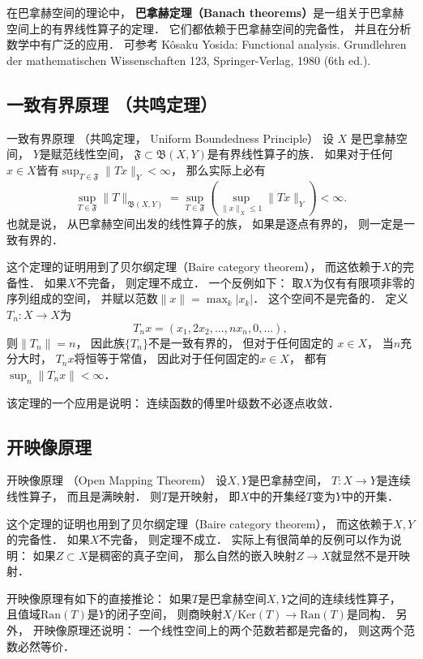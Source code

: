 
在巴拿赫空间的理论中， \textbf{巴拿赫定理（Banach theorems）}是一组关于巴拿赫空间上的有界线性算子的定理． 它们都依赖于巴拿赫空间的完备性， 并且在分析数学中有广泛的应用． 可参考 Kôsaku Yosida: Functional analysis. Grundlehren der mathematischen Wissenschaften 123, Springer-Verlag, 1980 (6th ed.).

\subsection{一致有界原理 （共鸣定理）}
\begin{theorem}{一致有界原理 （共鸣定理， Uniform Boundedness Principle）}
设 $X$ 是巴拿赫空间， $Y$是赋范线性空间， $\mathfrak{F}\subset\mathfrak{B}(X,Y)$是有界线性算子的族． 如果对于任何$x\in X$皆有$\sup_{T\in\mathfrak{F}}\|Tx\|_Y<\infty$， 那么实际上必有
$$
\sup_{T\in\mathfrak{F}}\|T\|_{\mathfrak{B}(X,Y)}
=\sup_{T\in\mathfrak{F}}\left(\sup_{\|x\|_X\leq 1}\|Tx\|_Y\right)<\infty.
$$
也就是说， 从巴拿赫空间出发的线性算子的族， 如果是逐点有界的， 则一定是一致有界的． 
\end{theorem}
这个定理的证明用到了贝尔纲定理（Baire category theorem）， 而这依赖于$X$的完备性． 如果$X$不完备， 则定理不成立． 一个反例如下： 取$X$为仅有有限项非零的序列组成的空间， 并赋以范数$\|x\|=\max_{k}|x_k|$． 这个空间不是完备的． 定义$T_n:X\to X$为
$$
T_nx=(x_1,2x_2,...,nx_n,0,...),
$$
则$\|T_n\|=n$， 因此族$\{T_n\}$不是一致有界的， 但对于任何固定的 $x\in X$， 当$n$充分大时， $T_nx$将恒等于常值， 因此对于任何固定的$x\in X$， 都有$\sup_n\|T_nx\|<\infty$．

该定理的一个应用是说明： 连续函数的傅里叶级数不必逐点收敛． 

\subsection{开映像原理}
\begin{theorem}{开映像原理 （Open Mapping Theorem）}
设$X,Y$是巴拿赫空间， $T:X\to Y$是连续线性算子， 而且是满映射． 则$T$是开映射， 即$X$中的开集经$T$变为$Y$中的开集．
\end{theorem}

这个定理的证明也用到了贝尔纲定理（Baire category theorem）， 而这依赖于$X,Y$的完备性． 如果$X$不完备， 则定理不成立． 实际上有很简单的反例可以作为说明： 如果$Z\subset X$是稠密的真子空间， 那么自然的嵌入映射$Z\to X$就显然不是开映射．

开映像原理有如下的直接推论： 如果$T$是巴拿赫空间$X,Y$之间的连续线性算子， 且值域$\text{Ran}(T)$是$Y$的闭子空间， 则商映射$X/\text{Ker}(T)\to \text{Ran}(T)$是同构． 另外， 开映像原理还说明： 一个线性空间上的两个范数若都是完备的， 则这两个范数必然等价．

